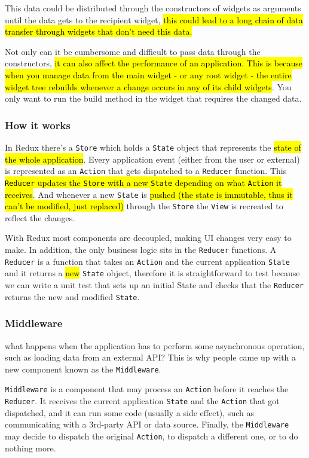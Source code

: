 This data could be distributed through the constructors of widgets as arguments 
until the data gets to the recipient widget, 
\hl{this could lead to a long chain of data transfer through widgets that don't need this data.}

Not only can it be cumbersome and difficult to pass data through the constructors, 
\hl{it can also affect the performance of an application. This is because when you manage 
data from the main widget - or any root widget - the entire widget tree rebuilds 
whenever a change occurs in any of its child widgets}. You only want to run the 
build method in the widget that requires the changed data.

\subsubsection{How it works}
In Redux there's a \texttt{Store} which holds a \texttt{State} object that represents the 
\hl{state of the whole application}. Every application event (either from the user or external) 
is represented as an \texttt{Action} that gets dispatched to a \texttt{Reducer} function. 
This \hl{\texttt{Reducer} updates the \texttt{Store} with a new \texttt{State} depending on 
what \texttt{Action} it receives}.  
And whenever a new \texttt{State} is \hl{pushed (the state is immutable, thus it can't be 
modified, just replaced)}  through the \texttt{Store} the \texttt{View} is recreated to reflect 
the changes.

With Redux most components are decoupled, making UI changes very easy to make.
 In addition, the only business logic sits in the \texttt{Reducer} functions. 
 A \texttt{Reducer} is a function that takes an \texttt{Action} and the current application
  \texttt{State} and it returns a \hl{new} \texttt{State} object, therefore it is straightforward 
  to test because we can write a unit test that sets up an initial State and checks that 
  the \texttt{Reducer} returns the new and modified \texttt{State}.

\subsubsection{Middleware}
what happens when the application has to perform some asynchronous operation, such as 
loading data from an external API? This is why people came up with a new component
 known as the \texttt{Middleware}.

\texttt{Middleware} is a component that may process an \texttt{Action} before 
it reaches the \texttt{Reducer}. It receives the current application \texttt{State}
 and the \texttt{Action} that got dispatched, and it can run some code 
 (usually a side effect), such as communicating with a 3rd-party API or data source. 
 Finally, the \texttt{Middleware} may decide to dispatch the original \texttt{Action}, 
 to dispatch a different one, or to do nothing more. 
 
